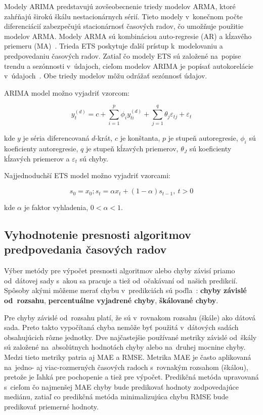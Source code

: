 \documentclass[thesismargins, thesislinespacing, openright, upjsfrontpage]{rnthesis}
\begin{document}
Modely ARIMA predstavujú zovšeobecnenie triedy modelov ARMA, ktoré zahŕňajú širokú škálu nestacionárnych sérií. Tieto modely v~konečnom počte diferenciácií zabezpečujú stacionárnosť časových radov, čo umožňuje použitie modelov ARMA. Modely ARMA sú kombináciou auto-regresie (AR) a kĺzavého priemeru (MA)~\cite{box2015time}. Trieda ETS poskytuje ďalší prístup k~modelovaniu a predpovedaniu časových radov. Zatiaľ čo modely ETS sú založené na~popise trendu a sezónnosti v~údajoch, cieľom modelov ARIMA je popísať autokorelácie v~údajoch~\cite{hyndman2018forecasting}. Obe triedy modelov môžu odrážať sezónnosť údajov.

ARIMA model možno vyjadriť vzorcom:
 
\begin{equation}
y_t^{(d)} = c + \sum_{i = 1} ^ {p} \phi_{i} y_{ti}^{(d)} + \sum_{j = 1}^{q} \theta_j \varepsilon_{tj} + \varepsilon_t
\end{equation}
 
kde $y$ je séria diferencovaná $d$-krát, $c$ je konštanta, $p$ je stupeň autoregresie, $\phi_i$ sú koeficienty autoregresie, $q$ je stupeň kĺzavých priemerov, $\theta_J$ sú koeficienty kĺzavých priemerov a $\varepsilon_t$ sú chyby.

Najjednoduchší ETS model možno vyjadriť vzorcami:

\begin{equation}
s_{0} = x_{0}; s_{t} = \alpha x_{t}+(1-\alpha )s_{t-1},\ t>0
\end{equation}

kde $\alpha$ je faktor vyhladenia, $0<\alpha <1$.

\subsection{Vyhodnotenie presnosti algoritmov predpovedania časových radov}

Výber metódy pre výpočet presnosti algoritmov alebo chyby závisí priamo od~dátovej sady s~akou sa pracuje a tiež od~očakávaní od~našich predikcií. Spôsoby akými môžeme merať chybu v~predikciách sú poďla~\cite{hyndman2018forecasting}:  \textbf{chyby závislé od~rozsahu}, \textbf{percentuálne vyjadrené chyby},  \textbf{škálované chyby}. 

Pre chyby závislé od~rozsahu platí, že sú v~rovnakom rozsahu (škále) ako dátová sada. Preto takto vypočítaná chyba nemôže byť použitá v~dátových sadách obsahujúcich rôzne jednotky. Dve najčastejšie používané metriky závislé od~škály sú založené na~absolútnych hodnotách chyby alebo na~druhej mocnine chyby. Medzi tieto metriky patria aj MAE a RMSE. Metrika MAE je často aplikovaná na~jedno- aj viac-rozmerných časových radoch s~rovnakým rozsahom (škálou), pretože je ľahká pre pochopenie a tiež pre výpočet. Predikčná metóda upravovaná s~cieľom čo najmenšej MAE chyby bude predikovať hodnoty zodpovedajúce mediánu, zatiaľ co predikčná metóda minimalizujúca chybu RMSE bude predikovať priemerné hodnoty. 
\end{document}
